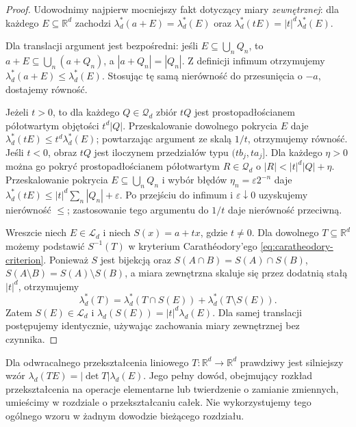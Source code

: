 \begin{proof}
Udowodnimy najpierw mocniejszy fakt dotyczący miary
\emph{zewnętrznej}: dla każdego $E\subseteq\mathbb R^d$
zachodzi
$\lambda_d^*(a+E)=\lambda_d^*(E)$ oraz
$\lambda_d^*(tE)=|t|^d\lambda_d^*(E)$.

Dla translacji argument jest bezpośredni: jeśli
$E\subseteq\bigcup_nQ_n$, to
$a+E\subseteq\bigcup_n(a+Q_n)$, a
$|a+Q_n|=|Q_n|$. Z definicji infimum otrzymujemy
$\lambda_d^*(a+E)\le\lambda_d^*(E)$.
Stosując tę samą nierówność do przesunięcia o $-a$,
dostajemy równość.

Jeżeli $t>0$, to dla każdego $Q\in\mathcal Q_d$
zbiór $tQ$ jest prostopadłościanem półotwartym
objętości $t^d|Q|$. Przeskalowanie dowolnego
pokrycia $E$ daje
$\lambda_d^*(tE)\le t^d\lambda_d^*(E)$;
powtarzając argument ze skalą $1/t$, otrzymujemy
równość. Jeśli $t<0$, obraz $tQ$ jest iloczynem
przedziałów typu $(tb_j,ta_j]$. Dla każdego
$\eta>0$ można go pokryć prostopadłościanem
półotwartym $R\in\mathcal Q_d$ o
$|R|<|t|^d|Q|+\eta$. Przeskalowanie pokrycia
$E\subseteq\bigcup_nQ_n$ i wybór błędów
$\eta_n=\varepsilon2^{-n}$ daje
$\lambda_d^*(tE)\le |t|^d\sum_n|Q_n|+\varepsilon$.
Po przejściu do infimum i $\varepsilon\downarrow0$
uzyskujemy nierówność $\le$; zastosowanie tego
argumentu do $1/t$ daje nierówność przeciwną.

Wreszcie niech $E\in\mathcal L_d$ i niech
$S(x)=a+tx$, gdzie $t\ne0$. Dla dowolnego
$T\subseteq\mathbb R^d$ możemy podstawić
$S^{-1}(T)$ w kryterium Carathéodory'ego
\eqref{eq:caratheodory-criterion}. Ponieważ $S$ jest
bijekcją oraz
$S(A\cap B)=S(A)\cap S(B)$,
$S(A\setminus B)=S(A)\setminus S(B)$,
a miara zewnętrzna skaluje się przez dodatnią
stałą $|t|^d$, otrzymujemy
\[
\lambda_d^*(T)=\lambda_d^*(T\cap S(E))
+\lambda_d^*(T\setminus S(E)).
\]
Zatem $S(E)\in\mathcal L_d$ i
$\lambda_d(S(E))=|t|^d\lambda_d(E)$.
Dla samej translacji postępujemy identycznie,
używając zachowania miary zewnętrznej bez czynnika.
\end{proof}

\begin{uwaga}
Dla odwracalnego przekształcenia liniowego
$T:\mathbb R^d\to\mathbb R^d$ prawdziwy jest
silniejszy wzór $\lambda_d(TE)=|\det T|\lambda_d(E)$.
Jego pełny dowód, obejmujący rozkład przekształcenia
na operacje elementarne lub twierdzenie o zamianie
zmiennych, umieścimy w rozdziale o przekształcaniu całek.
Nie wykorzystujemy tego ogólnego wzoru w żadnym
dowodzie bieżącego rozdziału.
\end{uwaga}


